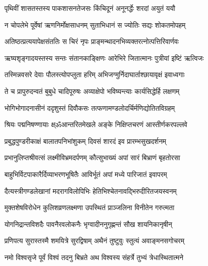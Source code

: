 \storymeta


\twolineshloka
{पृथिवीं शासतस्तस्य पाकशासनतेजसः}
{किंचिदूनं अनूनर्द्धेः शरदां अयुतं ययौ}%

\twolineshloka
{न चोपलेभे पूर्वेषां ऋणनिर्मोक्षसाधनम्}
{सुताभिधानं स ज्योतिः सद्यः शोकतमोपहम्}%

\twolineshloka
{अतिष्ठत्प्रत्ययापेक्षसंततिः स चिरं नृपः}
{प्राङ्मन्थादनभिव्यक्तरत्नोत्पत्तिरिवार्णवः}%

\twolineshloka
{ऋष्यशृङ्गादयस्तस्य सन्तः संतानकाङ्क्षिणः}
{आरेभिरे जितात्मानः पुत्रीयां इष्टिं ऋत्विजः}%

\twolineshloka
{तस्मिन्नवसरे देवाः पौलस्त्योपप्लुता हरिम्}
{अभिजग्मुर्निदाघार्ताश्छायावृक्षं इवाध्वगाः}%

\twolineshloka
{ते च प्रापुरुदन्वतं बुबुधे चादिपूरुषः}
{अव्याक्षेपो भविष्यन्त्याः कार्यसिद्धेर्हि लक्षणम्}%

\twolineshloka
{भोगिभोगादनासीनं ददृशुस्तं दिवौकसः}
{तत्फणामण्डलोदर्चिर्मणिद्योतितविग्रहम्}%

\twolineshloka
{श्रियः पद्मनिषण्णायाः क्ष्ॐआन्तरितमेखले}
{अङ्के निक्षिप्तचरणं आस्तीर्णकरपल्लवे}%

\twolineshloka
{प्रबुद्धपुण्डरीकाक्षं बालातपनिभांशुकम्}
{दिवसं शारदं इव प्रारम्भसुखदर्शनम्}%

\twolineshloka
{प्रभानुलिप्तश्रीवत्सं लक्ष्मीविभ्रमदर्पणम्}
{कौत्सुभाख्यं अपां सारं बिभ्राणं बृहतोरसा}%

\twolineshloka
{बाहुभिर्विटपाकारैर्दिव्याभरणभूषितैः}
{आविर्भूतं अपां मध्ये पारिजातं इवापरम्}%

\twolineshloka
{दैत्यस्त्रीगण्डलेखानां मदरागविलोपिभिः}
{हेतिभिश्चेतनावद्भिरुदीरितजयस्वनम्}%

\twolineshloka
{मुक्तशेषविरोधेन कुलिशव्रणलक्ष्मणा}
{उपस्थितं प्राञ्जलिना विनीतेन गरुत्मता}%

\twolineshloka
{योगनिद्रान्तविशदैः पावनैरवलोकनैः}
{भृग्वादीननुगृह्णन्तं सौख शायनिकानृषीन्}%

\twolineshloka
{प्रणिपत्य सुरास्तस्मै शमयित्रे सुरद्विषाम्}
{अथैनं तुष्टुवुः स्तुत्यं अवाङ्मनसगोचरम्}%

\twolineshloka
{नमो विश्वसृजे पूर्वं विश्वं तदनु बिभ्रते}
{अथ विश्वस्य संहर्त्रे तुभ्यं त्रेधास्थितात्मने}%


